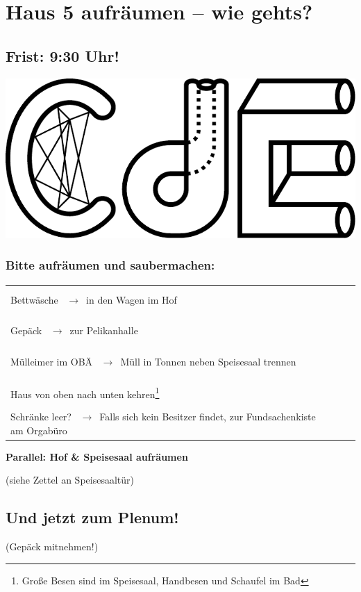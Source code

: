 \documentclass[14pt,parskip=full+]{scrartcl}
\newcommand{\checkfield}{~ \hfill ~\raisebox{-5pt}{\tikz\node[draw,minimum width=16.8pt,minimum height=16.8pt]{};}}
\newcommand{\pfeil}{~\ensuremath{\rightarrow}~}
\newcommand{\mysection}[1]{\vspace{-.7\baselineskip}\subsubsection*{#1} \vspace{-.7\baselineskip}}
\begin{document}
\parbox[t]{.8\textwidth}{\vskip0pt
\section*{Haus 5 aufräumen -- wie gehts?}
\subsection*{Frist: 9:30 Uhr!}
}
\parbox[t]{.2\textwidth}{\vskip0pt 
\includegraphics[width=.18\textwidth]{pa24_logo.pdf}%
}

\bigskip

\def\arraystretch{1.3}

\mysection{Bitte aufräumen und saubermachen:}
\begin{tabularx}{\textwidth}{Xc}
Bettwäsche \pfeil in den Wagen im Hof & \checkfield \\
Gepäck \pfeil zur Pelikanhalle & \checkfield \\
Mülleimer im OBÄ \pfeil Müll in Tonnen neben Speisesaal trennen & \checkfield \\
Haus von oben nach unten kehren\footnote{Große Besen sind im Speisesaal, Handbesen und Schaufel im Bad} & \checkfield \\
Schränke leer? \pfeil Falls sich kein Besitzer findet, zur Fundsachenkiste am Orgabüro & \checkfield
\end{tabularx}
 
\textbf{Parallel: Hof \& Speisesaal aufräumen}

(siehe Zettel an Speisesaaltür)

\subsection*{Und jetzt zum Plenum!}
\vspace{-\baselineskip}
(Gepäck mitnehmen!)
\end{document}

